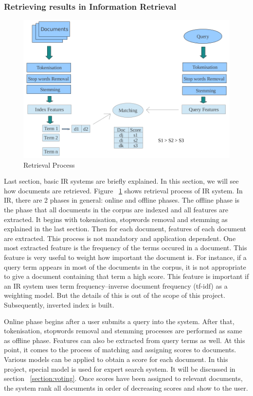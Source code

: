 \subsubsection{Retrieving results in Information Retrieval}\label{section:retrieving}
\begin{figure}
\centering
\includegraphics[scale=0.3]{./figures/retrieval.png}
\caption{Retrieval Process} \label{fig:retrieval} 
\end{figure}
Last section, basic IR systems are briefly explained. In this section, we will see how documents are retrieved. Figure ~\ref{fig:retrieval} shows
retrieval process of IR system. In IR, there are 2 phases in general:
online and offline phases. The offline phase is the phase that all documents in the corpus are indexed and all features are extracted. It begins with
tokenisation, stopwords removal and stemming as explained in the last section. Then for each document, features of each document are extracted. This
process is not mandatory and application dependent. One most extracted feature is the frequency of the terms occured in a document. This feature is very useful
to weight how important the document is. For instance, if a query term appears in most of the documents in the corpus, it is not appropriate to give a 
document containing that term a high score. This feature is important if an IR system uses term frequency–inverse document frequency (tf-idf) as a weighting model. But the details
of this is out of the scope of this project. Subsequently, inverted index is built.

Online phase begins after a user submits a query into the system. After that, tokenisation, stopwords removal and stemming processes are performed as same
as offline phase. Features can also be extracted from query terms as well. At this point, it comes to the process of matching and assigning scores to documents.
Various models can be applied to obtain a score for each document. In this project, special model is used for expert search system. It will be discussed
in section ~\ref{section:voting}. Once scores have been assigned to relevant documents, the system rank all documents in order of decreasing scores and 
show to the user.

